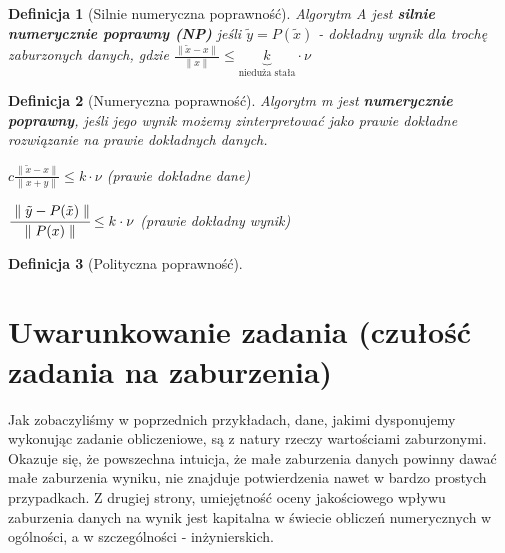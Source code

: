\documentclass[hidelinks,a4paper,fleqn,oneside]{book}
\newtheorem{defi}{Definicja}
\begin{document}
\begin{defi}[Silnie numeryczna poprawność]
	Algorytm A jest \textbf{silnie numerycznie poprawny (NP)} jeśli $\tilde{y} = P(\tilde{x})$ - dokładny wynik dla trochę zaburzonych danych, gdzie $\frac{\parallel \tilde{x} - x\parallel}{\parallel x \parallel} \leq \underbrace{k}_{\textrm{nieduża stała}} \cdot \nu$
\end{defi}

\begin{defi}[Numeryczna poprawność]
	Algorytm m jest \textbf{numerycznie poprawny}, jeśli jego wynik możemy zinterpretować jako prawie dokładne rozwiązanie na prawie dokładnych danych.
	
	$c\frac{\parallel \tilde{x} - x \parallel}{\parallel x + y \parallel} \leq k \cdot \nu$ (prawie dokładne dane)
	
	$\cfrac{\parallel \tilde{y} - P(\tilde{x}) \parallel}{\parallel P(x) \parallel} \leq k \cdot \nu$ (prawie dokładny wynik)
	
\end{defi}

{\centering {}\par}

\begin{defi}[Polityczna poprawność]\end{defi}

\section{Uwarunkowanie zadania (czułość zadania na zaburzenia)}
Jak zobaczyliśmy w poprzednich przykładach, dane, jakimi dysponujemy wykonując zadanie obliczeniowe, są z natury rzeczy wartościami zaburzonymi. Okazuje się, że powszechna intuicja, że małe zaburzenia danych powinny dawać małe zaburzenia wyniku, nie znajduje potwierdzenia nawet w bardzo prostych przypadkach. Z drugiej strony, umiejętność oceny jakościowego wpływu zaburzenia danych na wynik jest kapitalna w świecie obliczeń numerycznych w ogólności, a w szczególności - inżynierskich.
\end{document}
